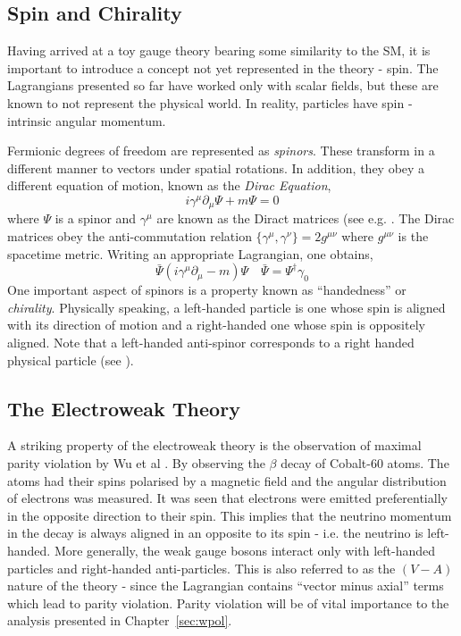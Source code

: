 \subsection{Spin and Chirality}
Having arrived at a toy gauge theory bearing some similarity to the \ac{SM}, it
is important to introduce a concept not yet represented in the theory -
spin. The Lagrangians presented so far have worked only with scalar fields, but
these are known to not represent the physical world. In reality, particles have
spin - intrinsic angular momentum.

Fermionic degrees of freedom are represented as \emph{spinors}. These transform
in a different manner to vectors under spatial rotations. In addition, they obey
a different equation of motion, known as the \emph{Dirac Equation},
\begin{equation}
i\gamma^\mu \partial_{\mu}\Psi + m\Psi = 0
\end{equation}
where $\Psi$ is a spinor and $\gamma^{\mu}$ are known as the Diract matrices
(see e.g. \cite{aitchison}. The Dirac matrices obey the anti-commutation
relation $\{\gamma^{\mu}, \gamma^{\nu}\} = 2g^{\mu\nu}$ where $g^{\mu\nu}$ is
the spacetime metric. Writing an appropriate Lagrangian, one obtains,
\begin{equation}
\bar{\Psi} \left (i\gamma^{\mu}\partial_{\mu} -m\right)\Psi \quad \bar{\Psi} =
\Psi^{\dagger}\gamma_0
\end{equation}
One important aspect of spinors is a property known as ``handedness'' or
\emph{chirality}. Physically speaking, a left-handed particle is one whose spin
is aligned with its direction of motion and a right-handed one whose spin is
oppositely aligned. Note that a left-handed anti-spinor corresponds to a right
handed physical particle (see \cite{peskin_schroeder}).

\subsection{The Electroweak Theory}
A striking property of the electroweak theory is the observation of maximal
parity violation by Wu et al \cite{wu_parity}. By observing the $\beta$ decay of
Cobalt-60 atoms. The atoms had their spins polarised by a magnetic field and the
angular distribution of electrons was measured. It was seen that electrons were
emitted preferentially in the opposite direction to their spin. This implies
that the neutrino momentum in the decay is always aligned in an opposite to its
spin - i.e. the neutrino is left-handed. More generally, the weak gauge bosons
interact only with left-handed particles and right-handed anti-particles. This
is also referred to as the $(V-A)$ nature of the theory - since the Lagrangian
contains ``vector minus axial'' terms which lead to parity violation. Parity
violation will be of vital importance to the analysis presented in
Chapter~\ref{sec:wpol}.

